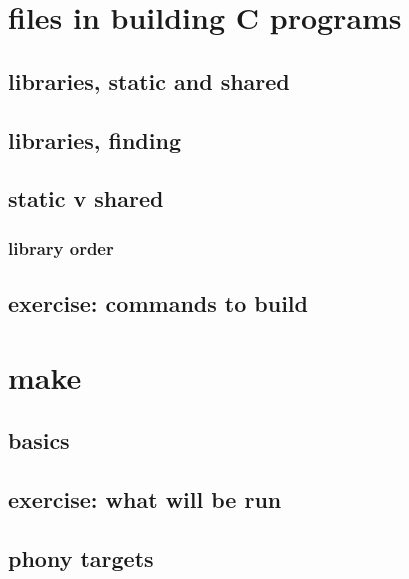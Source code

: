 \section{files in building C programs}


\subsection{libraries, static and shared}


\subsection{libraries, finding}


\subsection{static v shared}


\subsubsection{library order}


\subsection{exercise: commands to build}


\section{make}

\subsection{basics}



\subsection{exercise: what will be run}



\subsection{phony targets}

